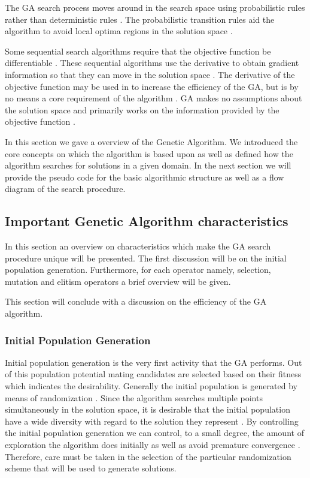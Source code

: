 The GA search process moves around in the search space using probabilistic rules rather than deterministic rules \cite{FamilyGA}. The probabilistic transition rules aid the algorithm to avoid local optima regions in the solution space \cite{HybridIntelliGA}. 

Some sequential search algorithms require that the objective function be differentiable \cite{ConstrainedGA}. These sequential algorithms use the derivative to obtain gradient information so that they can move in the solution space \cite{ConstrainedGA,SelfAdaptiveGA}. The derivative of the objective function may be used in to increase the efficiency of the GA, but is by no means a core requirement of the algorithm \cite{ConstrainedGA,HybridIntelliGA,SelfAdaptiveGA}. GA makes no assumptions about the solution space and primarily works on the information provided by the objective function \cite{ConstrainedGA,HybridIntelliGA}. 

In this section we gave a overview of the Genetic Algorithm. We introduced the core concepts on which the algorithm is based upon as well as defined how the algorithm searches for solutions in a given domain. In the next section we will provide the pseudo code for the basic algorithmic structure as well as a flow diagram of the search procedure.

\subsection{Important Genetic Algorithm characteristics}
In this section an overview on characteristics which make the GA search procedure unique will be presented. The first discussion will be on the initial population generation. Furthermore, for each operator namely, selection, mutation and elitism operators a brief overview will be given.

This section will conclude with a discussion on the efficiency of the GA algorithm.
\subsubsection{Initial Population Generation}
Initial population generation is the very first activity that the GA performs. Out of this population potential mating candidates are selected based on their fitness which indicates the desirability. Generally the initial population is generated by means of randomization \cite{SelfAdaptiveGA}. Since the algorithm searches multiple points simultaneously in the solution space, it is desirable that the initial population have a wide diversity with regard to the solution they represent \cite{CombinedBranchBoundGA,DistributedHierarchicalGA}. By controlling the initial population generation we can control, to a small degree, the amount of exploration the algorithm does initially as well as avoid premature convergence \cite{CombinedBranchBoundGA}. Therefore, care must be taken in the selection of the particular randomization scheme that will be used to generate solutions.

